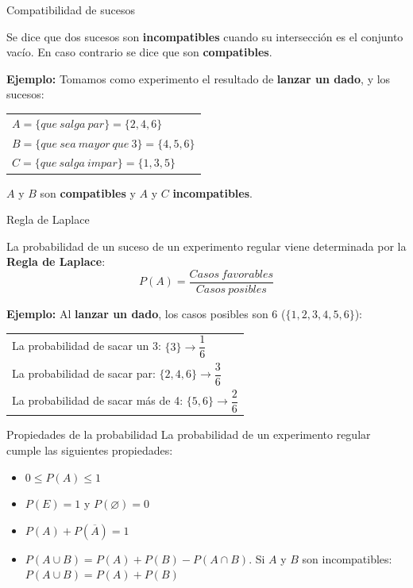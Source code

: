 \documentclass[11pt,handout]{beamer}
\begin{document}
\begin{frame}{Compatibilidad de sucesos}
\begin{block}{}
Se dice que dos sucesos son \textbf{incompatibles} cuando su intersección es el conjunto vacío. En caso contrario se dice que son \textbf{compatibles}.
\end{block}
\pause
\textbf{Ejemplo:} Tomamos como experimento el resultado de \textbf{lanzar un dado}, y los sucesos: \\
\begin{tabular}{l}
$A=\lbrace que\ salga\ par\rbrace=\lbrace2,4,6\rbrace$ \\
$B=\lbrace que\ sea\ mayor\ que\ 3\rbrace=\lbrace4,5,6\rbrace$ \\
$C=\lbrace que\ salga\ impar\rbrace=\lbrace1,3,5\rbrace$
\end{tabular}
\newline
$A$ y $B$ son \textbf{compatibles} y $A$ y $C$ \textbf{incompatibles}.

\end{frame}

\begin{frame}{Regla de Laplace}
\begin{block}{}
 La probabilidad de un suceso de un experimento regular viene determinada por la \textbf{Regla de Laplace}:
$$P(A)=\dfrac{Casos\ favorables}{Casos\ posibles} $$
\end{block}

\pause

\textbf{Ejemplo:} Al \textbf{lanzar un dado}, los casos posibles son 6 ($\lbrace1,2,3,4,5,6\rbrace$):\\
\begin{tabular}{l}
La probabilidad de sacar un 3: $\lbrace3\rbrace\to \dfrac{1}{6}$\\
La probabilidad de sacar par: $\lbrace2,4,6\rbrace\to\dfrac{3}{6}$ \\
La probabilidad de sacar más de 4: $\lbrace5,6\rbrace\to\dfrac{2}{6}$
\end{tabular}

\end{frame}

\begin{frame}{Propiedades de la probabilidad} La probabilidad de un experimento regular cumple las siguientes propiedades:
\begin{block}{}
    \begin{itemize}[<+->]
        \item $0 \leq P(A) \leq 1$ 
        \item $P(E) = 1$ y $P(\varnothing) = 0$
        \item $P(A) + P(\overline A) = 1$
        \item $P(A \cup B) = P(A) + P(B) - P(A \cap B)$. Si $A$ y $B$ son incompatibles: $P(A \cup B) = P(A) + P(B)$
    \end{itemize}

\end{block}

\end{frame}
\end{document}
